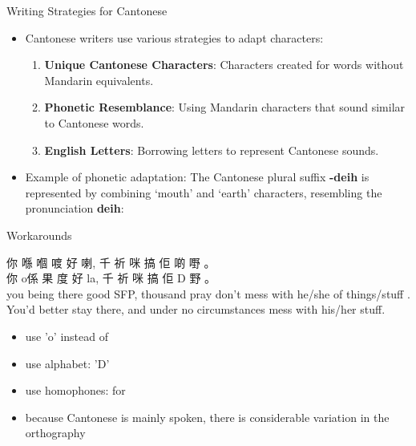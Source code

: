 \documentclass[xetex]{beamer}
\begin{document}
\begin{frame}{Writing Strategies for Cantonese}
\begin{itemize}
    \item Cantonese writers use various strategies to adapt characters:
    \begin{enumerate}
        \item \textbf{Unique Cantonese Characters}: Characters created for words without Mandarin equivalents.
        \item \textbf{Phonetic Resemblance}: Using Mandarin characters that sound similar to Cantonese words.
        \item \textbf{English Letters}: Borrowing letters to represent Cantonese sounds.
    \end{enumerate}
    \item Example of phonetic adaptation: The Cantonese plural suffix \textbf{-deih} is represented by combining ‘mouth’ and ‘earth’ characters, resembling the pronunciation \textbf{deih}: 
\end{itemize}
\end{frame}


\begin{frame}{Workarounds}


  \begin{exe}
  \ex
  \glll 你	喺	{嗰	喥}	好	喇,	千	祈	咪	搞	佢	啲	嘢 。 \\
	你	o係	{果	度}	好	la,	千	祈	咪	搞	佢	D	野 。 \\
        you	being	there	good	SFP,	thousand	pray	don't	{mess with}	he/she	of	things/stuff . \\
        \trans You'd better stay there, and under no circumstances mess with his/her stuff.
      \end{exe}
      \begin{itemize}
      \item use 'o' instead of 
      \item use alphabet: 'D'
      \item use homophones: 	 for 
      \item because Cantonese is mainly spoken, there is considerable
        variation in the orthography
      \end{itemize}
    \end{frame}
\end{document}
